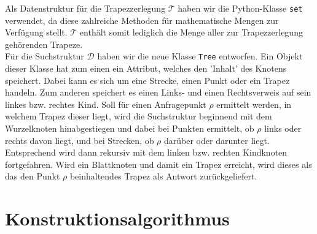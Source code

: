 \documentclass[11pt, a4paper]{article}
\newcommand{\T}{\ensuremath{\mathcal{T}} }
\newcommand{\D}{\ensuremath{\mathcal{D}} }
\begin{document}
Als Datenstruktur für die Trapezzerlegung \T haben wir die Python-Klasse \texttt{set} verwendet, da diese zahlreiche Methoden für mathematische Mengen zur Verfügung stellt. \T enthält somit lediglich die Menge aller zur Trapezzerlegung gehörenden Trapeze.\\
Für die Suchstruktur \D haben wir die neue Klasse \texttt{Tree} entworfen. Ein Objekt dieser Klasse hat zum einen ein Attribut, welches den 'Inhalt' des Knotens speichert. Dabei kann es sich um eine Strecke, einen Punkt oder ein Trapez handeln. Zum anderen speichert es einen Links- und einen Rechtsverweis auf sein linkes bzw. rechtes Kind. Soll für einen Anfragepunkt $\rho$ ermittelt werden, in welchem Trapez dieser liegt, wird die Suchstruktur beginnend mit dem Wurzelknoten hinabgestiegen und dabei bei Punkten ermittelt, ob $\rho$ links oder rechts davon liegt, und bei Strecken, ob $\rho$ darüber oder darunter liegt. Entsprechend wird dann rekursiv mit dem linken bzw. rechten Kindknoten fortgefahren. Wird ein Blattknoten und damit ein Trapez erreicht, wird dieses als das den Punkt $\rho$ beinhaltendes Trapez als Antwort zurückgeliefert.

\section{Konstruktionsalgorithmus}
\end{document}

